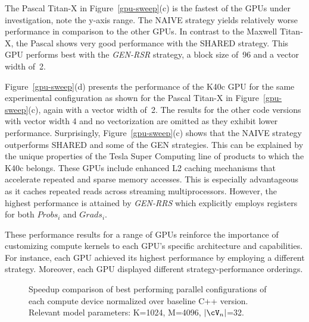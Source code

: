 The Pascal \mbox{Titan-X} in Figure~\ref{gpu-sweep}(c) is the fastest of the GPUs
under investigation, note the y-axis range. The NAIVE strategy yields relatively
worse performance in comparison to the other GPUs. In contrast to the Maxwell
\mbox{Titan-X}, the Pascal shows very good performance with the SHARED strategy.
This GPU performs best with the \textit{GEN-RSR} strategy, a block size of~96
and a vector width of~2.

\begin{comment}
\begin{figure*}[tb]	%
  \centering
  \epsfig{file=plots/k40-1024-strategies-w2.eps, width=\textwidth}
  \caption{Execution time of 1000 \textit{update\_phi} invocations using the K40c GPU, with
  explicit kernel vectorization of width 2, across a sweep of
  \textit{update\_phi} thread block
  sizes. Relevant model parameters: K=1024, M=4096, $|\Neighbors|$=32.}
  \label{k40-w2-sweep}
\end{figure*}
\end{comment}

Figure~\ref{gpu-sweep}(d) presents the performance of the K40c GPU
for the same experimental configuration as shown for the Pascal \mbox{Titan-X} in
Figure~\ref{gpu-sweep}(c), again with a vector width of~2. The results
for the other code versions with vector width 4 and no vectorization are
omitted as they exhibit lower performance.
%
Surprisingly, Figure~\ref{gpu-sweep}(c) shows that the NAIVE strategy
outperforms SHARED and some of the GEN strategies. This can be explained by the
unique properties of the Tesla Super Computing line of products to which the
K40c belongs. These GPUs include enhanced L2 caching mechanisms that
accelerate repeated and sparse memory accesses. This is especially advantageous
as it caches repeated reads across streaming multiprocessors. However, the
highest performance is attained by \textit{GEN-RRS} which explicitly employs
registers for both $Probs_i$ and $Grads_i$.

These performance results for a range of GPUs
reinforce the importance of customizing compute kernels to each GPU's specific
architecture and capabilities. For instance, each GPU achieved its highest
performance by employing a different strategy. Moreover, each GPU displayed
different strategy-performance orderings.

\begin{figure}[tb]	%
  \centering
  \caption{Speedup comparison of best performing parallel configurations of
  each compute device normalized over baseline C++ version. Relevant model
  parameters: K=1024, M=4096, $|\Neighbors|$=32.}
  \label{gpus-fig}
\end{figure}

